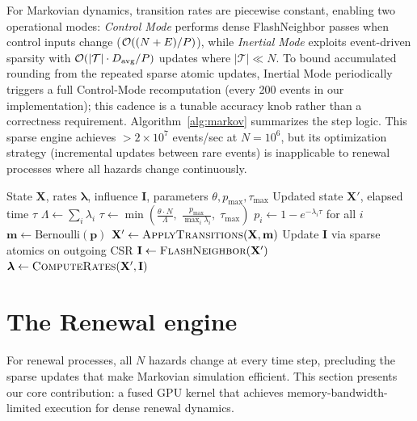 For Markovian dynamics\label{sec:markov_engine}, transition rates are piecewise constant, enabling two operational modes: \emph{Control Mode} performs dense FlashNeighbor passes when control inputs change ($\mathcal{O}((N + E)/P)$), while \emph{Inertial Mode} exploits event-driven sparsity with $\mathcal{O}(|\mathcal{T}| \cdot D_{\text{avg}} / P)$ updates where $|\mathcal{T}| \ll N$. To bound accumulated rounding from the repeated sparse atomic updates, Inertial Mode periodically triggers a full Control-Mode recomputation (every 200 events in our implementation); this cadence is a tunable accuracy knob rather than a correctness requirement. Algorithm~\ref{alg:markov} summarizes the step logic. This sparse engine achieves $>2 \times 10^7$ events/sec at $N = 10^6$, but its optimization strategy (incremental updates between rare events) is inapplicable to renewal processes where all hazards change continuously.

\begin{algorithm}[H]
\caption{Markovian Engine: One Tau-Leaping Step}
\label{alg:markov}
\begin{algorithmic}[1]
\Require State $\mathbf{X}$, rates $\bm{\lambda}$, influence $\mathbf{I}$, parameters $\theta, p_{\max}, \tau_{\max}$
\Ensure Updated state $\mathbf{X}'$, elapsed time $\tau$
\State $\Lambda \leftarrow \sum_i \lambda_i$ 
\State $\tau \leftarrow \min\!\left(\frac{\theta \cdot N}{\Lambda},\; \frac{p_{\max}}{\max_i \lambda_i},\; \tau_{\max}\right)$
\State $p_i \leftarrow 1 - e^{-\lambda_i \tau}$ for all $i$ 
\State $\mathbf{m} \leftarrow \text{Bernoulli}(\mathbf{p})$ 
\State $\mathbf{X}' \leftarrow \textsc{ApplyTransitions}(\mathbf{X}, \mathbf{m})$
    \State Update $\mathbf{I}$ via sparse atomics on outgoing CSR
\Else
    \State $\mathbf{I} \leftarrow \textsc{FlashNeighbor}(\mathbf{X}')$ 
\EndIf
\State $\bm{\lambda} \leftarrow \textsc{ComputeRates}(\mathbf{X}', \mathbf{I})$
\end{algorithmic}
\end{algorithm}

\section{The Renewal engine}\label{sec:renewal_engine}

For renewal processes, all $N$ hazards change at every time step, precluding the sparse updates that make Markovian simulation efficient. This section presents our core contribution: a fused GPU kernel that achieves memory-bandwidth-limited execution for dense renewal dynamics.

